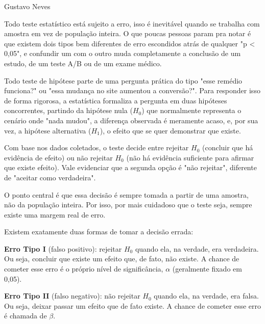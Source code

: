 {Gustavo Neves}
{

\hspace*{1.5em} Todo teste estatístico está sujeito a erro,
isso é inevitável quando se trabalha com amostra em vez de população inteira.
O que poucas pessoas param pra notar é que existem dois tipos bem diferentes de erro
escondidos atrás de qualquer "p < 0,05",
e confundir um com o outro muda completamente a conclusão de um estudo,
de um teste A/B ou de um exame médico.

\subtitle{Relembrando o teste de hipótese}

\hspace*{1.5em} Todo teste de hipótese parte de uma pergunta prática do
tipo "esse remédio funciona?" ou "essa mudança no site aumentou a conversão?".
Para responder isso de forma rigorosa,
a estatística formaliza a pergunta em duas hipóteses concorrentes, partindo da hipótese nula ($H_0$)
que normalmente representa o cenário onde "nada mudou", a diferença observada é meramente acaso,
e, por sua vez, a hipótese alternativa ($H_1$),
o efeito que se quer demonstrar que existe.

\hspace*{1.5em} Com base nos dados coletados,
o teste decide entre
rejeitar $H_0$ (concluir que há evidência de efeito)
ou não rejeitar $H_0$ (não há evidência suficiente para afirmar que existe efeito).
Vale evidenciar que a segunda opção é "não rejeitar", diferente de "aceitar como verdadeira".

\hspace*{1.5em} O ponto central é que essa decisão é sempre tomada a partir de uma amostra,
não da população inteira.
Por isso, por mais cuidadoso que o teste seja,
sempre existe uma margem real de erro.

\subtitle{Os dois jeitos de errar}

\hspace*{1.5em} Existem exatamente duas formas de tomar a decisão errada:

\begin{hypeitemize}
\item \textbf{Erro Tipo I} (falso positivo):
rejeitar $H_0$ quando ela, na verdade, era verdadeira.
Ou seja, concluir que existe um efeito que, de fato, não existe.
A chance de cometer esse erro é o próprio nível de significância,
$\alpha$ (geralmente fixado em 0,05).
\item \textbf{Erro Tipo II} (falso negativo):
não rejeitar $H_0$ quando ela, na verdade, era falsa.
Ou seja, deixar passar um efeito que de fato existe.
A chance de cometer esse erro é chamada de $\beta$.
\end{hypeitemize}

}
